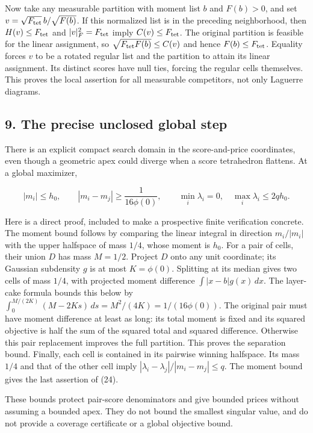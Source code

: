 \documentclass[
  11pt,
]{article}
\begin{document}
Now take any measurable partition with moment list \(b\) and \(F(b)>0\),
and set \(v=\sqrt{F_{\rm tet}}\,b/\sqrt{F(b)}\). If this normalized list
is in the preceding neighborhood, then \(H(v)\le F_{\rm tet}\) and
\(|v|_F^2=F_{\rm tet}\) imply \(C(v)\le F_{\rm tet}\). The original
partition is feasible for the linear assignment, so
\(\sqrt{F_{\rm tet}F(b)}\le C(v)\) and hence \(F(b)\le F_{\rm tet}\).
Equality forces \(v\) to be a rotated regular list and the partition to
attain its linear assignment. Its distinct scores have null ties,
forcing the regular cells themselves. This proves the local assertion
for all measurable competitors, not only Laguerre diagrams.

\subsection{9. The precise unclosed global
step}\label{the-precise-unclosed-global-step}

There is an explicit compact search domain in the score-and-price
coordinates, even though a geometric apex could diverge when a score
tetrahedron flattens. At a global maximizer,

\[
 |m_i|\le h_0,\qquad |m_i-m_j|\ge\frac{1}{16\phi(0)},\qquad
 \min_i\lambda_i=0,\quad\max_i\lambda_i\le2q h_0.         \tag{25}
\]

Here is a direct proof, included to make a prospective finite
verification concrete. The moment bound follows by comparing the linear
integral in direction \(m_i/|m_i|\) with the upper halfspace of mass
\(1/4\), whose moment is \(h_0\). For a pair of cells, their union \(D\)
has mass \(M=1/2\). Project \(D\) onto any unit coordinate; its Gaussian
subdensity \(g\) is at most \(K=\phi(0)\). Splitting at its median gives
two cells of mass \(1/4\), with projected moment difference
\(\int|x-b|g(x)\,dx\). The layer-cake formula bounds this below by
\(\int_0^{M/(2K)}(M-2Ks)\,ds=M^2/(4K)=1/(16\phi(0))\). The original pair
must have moment difference at least as long: its total moment is fixed
and its squared objective is half the sum of the squared total and
squared difference. Otherwise this pair replacement improves the full
partition. This proves the separation bound. Finally, each cell is
contained in its pairwise winning halfspace. Its mass \(1/4\) and that
of the other cell imply \(|\lambda_i-\lambda_j|/|m_i-m_j|\le q\). The
moment bound gives the last assertion of (24).

These bounds protect pair-score denominators and give bounded prices
without assuming a bounded apex. They do not bound the smallest singular
value, and do not provide a coverage certificate or a global objective
bound.
\end{document}
